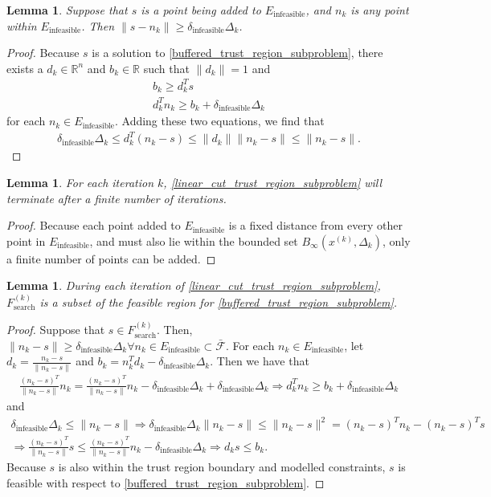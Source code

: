 \documentclass{article}
\newtheorem{lemma}[theorem]{Lemma}
\theoremstyle{case}
\newcommand{\xk}{{x^{(k)}}}
\newcommand{\Rn}{\mathbb R^n}
\newcommand{\reals}{\mathbb R}
\newcommand{\dk}{\Delta_k}
\newcommand{\feasible}{{\mathcal F}}
\newcommand{\trsinfset}{{E_\text{infeasible}}}
\newcommand{\trstol}{{\delta_\text{infeasible}}}
\newcommand{\trsfesset}{{F^{(k)}_\text{search}}}
\begin{document}
\begin{lemma}
Suppose that $s$ is a point being added to $ \trsinfset $, and $n_k$ is any point within $\trsinfset$.
Then $\|s - n_k\| \ge \trstol \dk$.
\end{lemma}

\begin{proof}
Because $s$ is a solution to \cref{buffered_trust_region_subproblem},
there exists a $d_k \in \Rn$ and $b_k \in \reals$ such that $\|d_k\| = 1$ and
\begin{align*}
 b_k \ge d_k^Ts\\
d_k^Tn_k \ge b_k + \trstol \dk
\end{align*}
for each $n_k \in \trsinfset$.
Adding these two equations, we find that
\begin{align*}
\trstol \dk \le d_k^T\left(n_k - s\right) \le \|d_k\|\|n_k - s\| \le \|n_k - s\|.
\end{align*}
\end{proof}


\begin{lemma}
For each iteration $k$, \cref{linear_cut_trust_region_subproblem} will terminate after a finite number of iterations.
\end{lemma}

\begin{proof}
Because each point added to $ \trsinfset $ is a fixed distance from every other point in $ \trsinfset $,
and must also lie within the bounded set $B_\infty(\xk, \dk)$, only a finite number of points can be added.
\end{proof}


\begin{lemma}
\label{trs_subset}
During each iteration of \cref{linear_cut_trust_region_subproblem}, $\trsfesset$ is a subset of the feasible region for \cref{buffered_trust_region_subproblem}.
\end{lemma}

\begin{proof}
Suppose that $s \in \trsfesset$.
Then, $\|n_k - s\| \ge \trstol \dk \forall n_k \in \trsinfset \subset \bar \feasible$.
For each $n_k \in \trsinfset$, let $d_k = \frac{n_k - s}{\|n_k - s\|}$ and $b_k = n_k^Td_k - \trstol\dk$.
Then we have that 
\begin{align*}
\frac{\left(n_k - s\right)^T}{\|n_k - s\|}n_k = \frac{\left(n_k - s\right)^T}{\|n_k - s\|}n_k  - \trstol\dk + \trstol\dk \Longrightarrow
d_k^Tn_k \ge b_k + \trstol\dk
\end{align*}
and
\begin{align*}
\trstol\dk \le \|n_k - s\| \Longrightarrow
\trstol\dk \|n_k - s\| \le  \|n_k - s\|^2 = \left(n_k - s\right)^Tn_k - \left(n_k - s\right)^T s\\
\Longrightarrow \frac{\left(n_k - s\right)^T}{\|n_k - s\|} s \le  \frac{\left(n_k - s\right)^T}{\|n_k - s\|}n_k - \trstol\dk \Longrightarrow
d_k s \le b_k.
\end{align*}
Because $s$ is also within the trust region boundary and modelled constraints, $s$ is feasible with respect to \cref{buffered_trust_region_subproblem}.
\end{proof}
\end{document}
